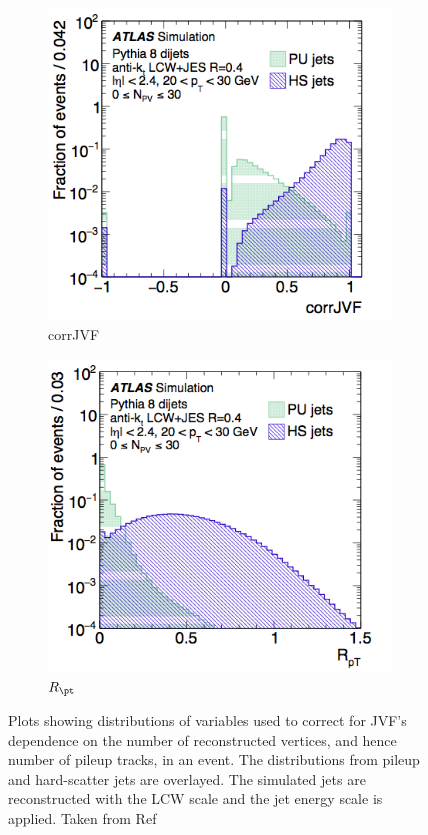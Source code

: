 \begin{figure}[!h]
\begin{subfigure}{0.5\textwidth}
   \includegraphics[width=\textwidth]{figures/corrJVF.png}
	\caption{corrJVF}
	\label{fig:corrJVF}
\end{subfigure} %
\begin{subfigure}{0.5\textwidth}
   \includegraphics[width=\textwidth]{figures/Rpt.png}
	\caption{$R_{\pt}$}
	\label{fig:Rpt}
\end{subfigure}
\caption{Plots showing distributions of variables used to correct for JVF's dependence on the number of 
reconstructed vertices, and hence number of pileup tracks, in an event. The distributions 
from pileup and hard-scatter jets are overlayed. The simulated jets are reconstructed with the 
LCW scale and the jet energy scale is applied. Taken from Ref~\cite{Aad:2015ina}}
\end{figure}

